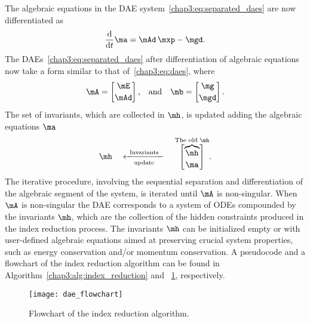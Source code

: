 The algebraic equations in the \ac{DAE} system~\eqref{chap3:eq:separated_daes} are now differentiated as
%
\begin{equation}
  \label{chap3:eq:diff_daes}
  \dfrac{\mathrm{d}}{\mathrm{d}t} \ma = \mAd \, \mxp - \mgd \text{.}
\end{equation}
%
The \acp{DAE}~\eqref{chap3:eq:separated_daes} after differentiation of algebraic equations now take a form similar to that of~\eqref{chap3:eq:daes}, where
%
\begin{equation}
  \label{chap3:eq:reduced_daes}
  \mA = \begin{bmatrix} \mE \\[0.2em] \mAd\end{bmatrix} \text{,}
  \quad \text{and} \quad
  \mb = \begin{bmatrix} \mg \\[0.2em] \mgd\end{bmatrix} \text{.}
\end{equation}
%
The set of invariants, which are collected in $\mh$, is updated adding the algebraic equations $\ma$
%
\begin{equation}
  \mh \quad \xleftarrow[\text{update}]{\text{\, Invariants \,}} \quad \overset{{\text{The old $\mh$}}}{\begin{bmatrix} \overbrace{\mh} \\[0.2em] \ma \end{bmatrix}} \text{.}
\end{equation}
%
The iterative procedure, involving the sequential separation and differentiation of the algebraic segment of the system, is iterated until $\mA$ is non-singular. When $\mA$ is non-singular the \ac{DAE} corresponds to a system of \acp{ODE} compounded by the invariants $\mh$, which are the collection of the hidden constraints produced in the index reduction process. The invariants $\mh$ can be initialized empty or with user-defined algebraic equations aimed at preserving crucial system properties, such as energy conservation and/or momentum conservation. A pseudocode and a flowchart of the index reduction algorithm can be found in Algorithm~\ref{chap3:alg:index_reduction} and \figurename~\ref{chap3:fig:index_reduction}, respectively.

\begin{figure}
  \centering
  \texttt{[image: dae\_flowchart]}
  \caption{Flowchart of the index reduction algorithm.}
  \label{chap3:fig:index_reduction}
\end{figure}

